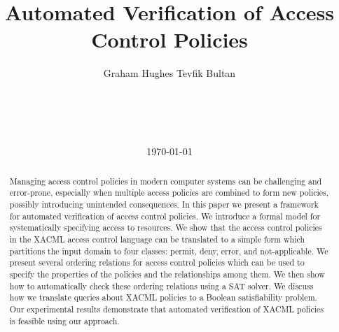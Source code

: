 \documentclass{acm_proc_article-sp}
\begin{document}
\title{Automated Verification of Access Control Policies}
\author{
\alignauthor Graham Hughes \quad Tevfik Bultan \\
       \\
       \\
       \\
       \\
}
\date\today
\maketitle

\begin{abstract}
  Managing access control policies in modern computer systems can be
  challenging and error-prone, especially when multiple access
  policies are combined to form new policies, possibly introducing
  unintended consequences.  In this paper we present a framework for
  automated verification of access control policies.  We introduce a
  formal model for systematically specifying access to resources.  We
  show that the access control policies in the XACML access control
  language can be translated to a simple form which partitions the
  input domain to four classes: permit, deny, error, and
  not-applicable.  We present several ordering relations for access
  control policies which can be used to specify the properties of
  the policies and the relationships among them.  We then show how to
  automatically check these ordering relations using a SAT solver.
  We discuss how we translate queries about XACML policies to a Boolean
  satisfiability problem.
  Our experimental results demonstrate that automated
  verification of XACML policies is feasible using our approach.
\end{abstract}












\end{document}
